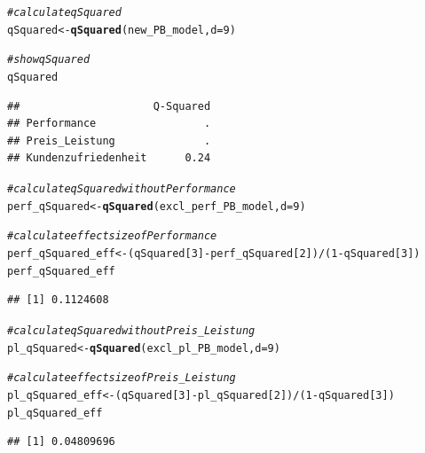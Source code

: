 \documentclass{article}\usepackage[]{graphicx}\usepackage[]{color}
\makeatletter
\newcommand{\hlnum}[1]{\textcolor[rgb]{0.686,0.059,0.569}{#1}}%
\newcommand{\hlcom}[1]{\textcolor[rgb]{0.678,0.584,0.686}{\textit{#1}}}%
\newcommand{\hlopt}[1]{\textcolor[rgb]{0,0,0}{#1}}%
\newcommand{\hlstd}[1]{\textcolor[rgb]{0.345,0.345,0.345}{#1}}%
\newcommand{\hlkwb}[1]{\textcolor[rgb]{0.69,0.353,0.396}{#1}}%
\newcommand{\hlkwc}[1]{\textcolor[rgb]{0.333,0.667,0.333}{#1}}%
\newcommand{\hlkwd}[1]{\textcolor[rgb]{0.737,0.353,0.396}{\textbf{#1}}}%
\newenvironment{kframe}{%
 \def\at@end@of@kframe{}%
 \ifinner\ifhmode%
  \def\at@end@of@kframe{\end{minipage}}%
  \begin{minipage}{\columnwidth}%
 \fi\fi%
 \def\FrameCommand##1{\hskip\@totalleftmargin \hskip-\fboxsep
 \colorbox{shadecolor}{##1}\hskip-\fboxsep
     \hskip-\linewidth \hskip-\@totalleftmargin \hskip\columnwidth}%
 \MakeFramed {\advance\hsize-\width
   \@totalleftmargin\z@ \linewidth\hsize
   \@setminipage}}%
 {\par\unskip\endMakeFramed%
 \at@end@of@kframe}
\newenvironment{knitrout}{}{} %
\makeatother
\begin{document}
\begin{knitrout}
\color{fgcolor}\begin{kframe}
\begin{alltt}
\hlcom{#calculate qSquared}
\hlstd{qSquared} \hlkwb{<-} \hlkwd{qSquared}\hlstd{(new_PB_model,} \hlkwc{d}\hlstd{=}\hlnum{9}\hlstd{)}

\hlcom{#show qSquared}
\hlstd{qSquared}
\end{alltt}
\begin{verbatim}
##                     Q-Squared
## Performance                 .
## Preis_Leistung              .
## Kundenzufriedenheit      0.24
\end{verbatim}
\begin{alltt}
\hlcom{#calculate qSquared without Performance}
\hlstd{perf_qSquared} \hlkwb{<-} \hlkwd{qSquared}\hlstd{(excl_perf_PB_model,} \hlkwc{d}\hlstd{=}\hlnum{9}\hlstd{)}

\hlcom{#calculate effect size of Performance}
\hlstd{perf_qSquared_eff} \hlkwb{<-} \hlstd{(qSquared[}\hlnum{3}\hlstd{]}\hlopt{-}\hlstd{perf_qSquared[}\hlnum{2}\hlstd{])}\hlopt{/}\hlstd{(}\hlnum{1}\hlopt{-}\hlstd{qSquared[}\hlnum{3}\hlstd{])}
\hlstd{perf_qSquared_eff}
\end{alltt}
\begin{verbatim}
## [1] 0.1124608
\end{verbatim}
\begin{alltt}
\hlcom{#calculate qSquared without Preis_Leistung}
\hlstd{pl_qSquared} \hlkwb{<-} \hlkwd{qSquared}\hlstd{(excl_pl_PB_model,} \hlkwc{d}\hlstd{=}\hlnum{9}\hlstd{)}

\hlcom{#calculate effect size of Preis_Leistung}
\hlstd{pl_qSquared_eff} \hlkwb{<-} \hlstd{(qSquared[}\hlnum{3}\hlstd{]}\hlopt{-}\hlstd{pl_qSquared[}\hlnum{2}\hlstd{])}\hlopt{/}\hlstd{(}\hlnum{1}\hlopt{-}\hlstd{qSquared[}\hlnum{3}\hlstd{])}
\hlstd{pl_qSquared_eff}
\end{alltt}
\begin{verbatim}
## [1] 0.04809696
\end{verbatim}
\end{kframe}
\end{knitrout}
\end{document}
